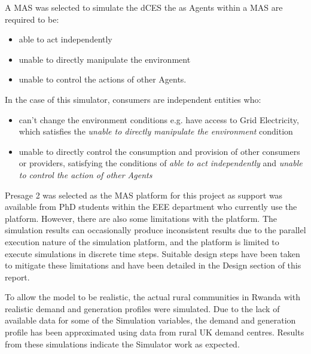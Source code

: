 A MAS was selected to simulate the dCES the as Agents within a MAS are required to be:
\begin{itemize}
	\item able to act independently
	\item unable to directly manipulate the environment
	\item unable to control the actions of other Agents. 
\end{itemize}

\clearpage

In the case of this simulator, consumers are independent entities who:
\begin{itemize}
 	\item can't change the environment conditions e.g. have access to Grid Electricity, which satisfies the \textit{unable to directly manipulate the environment} condition
 	\item unable to directly control the consumption and provision of other consumers or providers, satisfying the conditions of \textit{able to act independently} and \textit{unable to control the action of other Agents} 
\end{itemize}
Presage 2 was selected as the MAS platform for this project as support was available from PhD students within the EEE department who currently use the platform. However, there are also some limitations with the platform. The simulation results can occasionally produce inconsistent results due to the parallel execution nature of the simulation platform, and the platform is limited to execute simulations in discrete time steps. Suitable design steps have been taken to mitigate these limitations and have been detailed in the Design section of this report. 

To allow the model to be realistic, the actual rural communities in Rwanda with realistic demand and generation profiles were simulated. Due to the lack of available data for some of the Simulation variables, the demand and generation profile has been approximated using data from rural UK demand centres. Results from these simulations indicate the Simulator work as expected.
